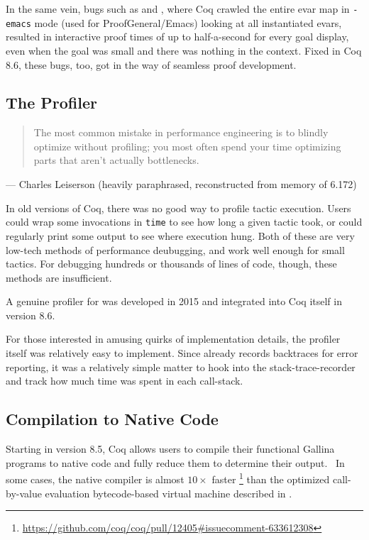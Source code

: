 In the same vein, bugs such as  and , where Coq crawled the entire evar map in \texttt{-emacs} mode (used for ProofGeneral/Emacs) looking at all instantiated evars, resulted in interactive proof times of up to half-a-second for every goal display, even when the goal was small and there was nothing in the context.
Fixed in Coq 8.6, these bugs, too, got in the way of seamless proof development.

\subsection{The \Ltac\space Profiler}\label{sec:ltac-prof}
\begin{quote}
  The most common mistake in performance engineering is to blindly optimize without profiling; you most often spend your time optimizing parts that aren't actually bottlenecks.
\end{quote}
\begin{flushright}
  --- Charles Leiserson (heavily paraphrased, reconstructed from memory of 6.172)
\end{flushright}

In old versions of Coq, there was no good way to profile tactic execution.
Users could wrap some invocations in \texttt{time} to see how long a given tactic took, or could regularly print some output to see where execution hung.
Both of these are very low-tech methods of performance deubugging, and work well enough for small tactics.
For debugging hundreds or thousands of lines of \Ltac\space code, though, these methods are insufficient.

A genuine profiler for \Ltac\space was developed in 2015 and integrated into Coq itself in version 8.6.~\cite{coqpl-15-ltac-profiler}

For those interested in amusing quirks of implementation details, the profiler itself was relatively easy to implement.
Since \Ltac\space already records backtraces for error reporting, it was a relatively simple matter to hook into the stack-trace-recorder and track how much time was spent in each call-stack.


\subsection{Compilation to Native Code}\label{sec:native-compiler}
Starting in version 8.5, Coq allows users to compile their functional Gallina programs to native code and fully reduce them to determine their output.~\cite{nativecompute,coq-commit-native-compiler}
In some cases, the native compiler is almost $10\times$ faster%
\footnote{\url{https://github.com/coq/coq/pull/12405\#issuecomment-633612308}}
than the optimized call-by-value evaluation bytecode-based virtual machine described in \textcite{Gregoire-Leroy-02}.

